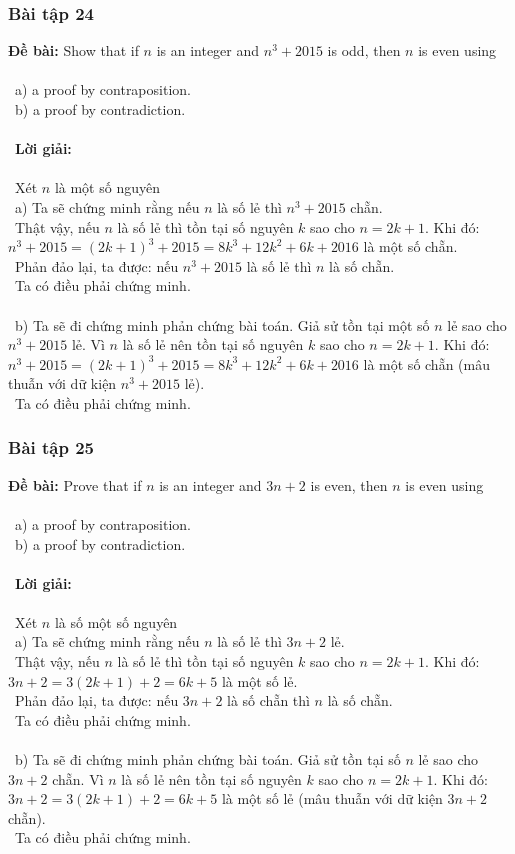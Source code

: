 \documentclass[a4paper]{article}
\begin{document}
\subsubsection{Bài tập 24}
\textbf{Đề bài: } Show that if $n$ is an integer and $n^3 + 2015$ is odd, then $n$ is even using \\\ \\\
a) a proof by contraposition. \\\
b) a proof by contradiction.\\\ \\\
\textbf{Lời giải:} \\\ \\\
Xét $n$ là một số nguyên \\\
a) Ta sẽ chứng minh rằng nếu $n$ là số lẻ thì $n^3 + 2015$ chẵn. \\\
Thật vậy, nếu $n$ là số lẻ thì tồn tại số nguyên $k$ sao cho $n = 2k+1$. Khi đó: $n^3+2015 = (2k+1)^3+2015=8k^3 + 12k^2+6k + 2016$ là một số chẵn.\\\
Phản đảo lại, ta được: nếu $n^3+2015$ là số lẻ thì $n$ là số chẵn. \\\
Ta có điều phải chứng minh. \\\ \\\
b) Ta sẽ đi chứng minh phản chứng bài toán. Giả sử tồn tại một số $n$ lẻ sao cho $n^3+2015$ lẻ. Vì $n$ là số lẻ nên tồn tại số nguyên $k$ sao cho $n = 2k+1$. Khi đó: $n^3+2015 = (2k+1)^3+2015=8k^3 + 12k^2+6k + 2016$ là một số chẵn (mâu thuẫn với dữ kiện $n^3 + 2015$ lẻ). \\\
Ta có điều phải chứng minh.

\clearpage
\subsubsection{Bài tập 25}
\textbf{Đề bài: } Prove that if $n$ is an integer and $3n + 2$ is even, then $n$ is even using \\\ \\\
a) a proof by contraposition. \\\
b) a proof by contradiction.\\\ \\\
\textbf{Lời giải:} \\\ \\\
Xét $n$ là số một số nguyên \\\
a) Ta sẽ chứng minh rằng nếu $n$ là số lẻ thì $3n+2$ lẻ. \\\
Thật vậy, nếu $n$ là số lẻ thì tồn tại số nguyên $k$ sao cho $n = 2k+1$. Khi đó: $3n+2 = 3(2k+1)+2 = 6k + 5$ là một số lẻ.\\\
Phản đảo lại, ta được: nếu $3n+2$ là số chẵn thì $n$ là số chẵn. \\\
Ta có điều phải chứng minh. \\\ \\\
b) Ta sẽ đi chứng minh phản chứng bài toán. Giả sử tồn tại số $n$ lẻ sao cho $3n+2$ chẵn. Vì $n$ là số lẻ nên tồn tại số nguyên $k$ sao cho $n = 2k+1$. Khi đó: $3n+2 = 3(2k+1)+2 = 6k + 5$ là một số lẻ (mâu thuẫn với dữ kiện $3n+2$ chẵn). \\\
Ta có điều phải chứng minh.
\\\ \\\
\clearpage
\end{document}
